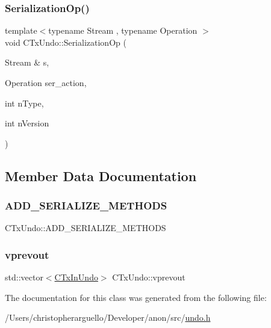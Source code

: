 \subsubsection{\texorpdfstring{Serialization\+Op()}{SerializationOp()}}
{\footnotesize\ttfamily template$<$typename Stream , typename Operation $>$ \\
void C\+Tx\+Undo\+::\+Serialization\+Op (\begin{DoxyParamCaption}\item[{Stream \&}]{s,  }\item[{Operation}]{ser\+\_\+action,  }\item[{int}]{n\+Type,  }\item[{int}]{n\+Version }\end{DoxyParamCaption})\hspace{0.3cm}{\ttfamily [inline]}}



\subsection{Member Data Documentation}
\mbox{\label{class_c_tx_undo_a8b7b4f167a00e200723165b3446cc4c4}} 
\subsubsection{\texorpdfstring{A\+D\+D\+\_\+\+S\+E\+R\+I\+A\+L\+I\+Z\+E\+\_\+\+M\+E\+T\+H\+O\+DS}{ADD\_SERIALIZE\_METHODS}}
{\footnotesize\ttfamily C\+Tx\+Undo\+::\+A\+D\+D\+\_\+\+S\+E\+R\+I\+A\+L\+I\+Z\+E\+\_\+\+M\+E\+T\+H\+O\+DS}

\mbox{\label{class_c_tx_undo_a035e62f0b46f0d4ba392dad686ed18de}} 
\subsubsection{\texorpdfstring{vprevout}{vprevout}}
{\footnotesize\ttfamily std\+::vector$<$\mbox{\hyperlink{class_c_tx_in_undo}{C\+Tx\+In\+Undo}}$>$ C\+Tx\+Undo\+::vprevout}



The documentation for this class was generated from the following file\+:\begin{DoxyCompactItemize}
\item 
/\+Users/christopherarguello/\+Developer/anon/src/\mbox{\hyperlink{undo_8h}{undo.\+h}}\end{DoxyCompactItemize}
